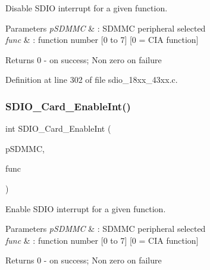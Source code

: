 Disable S\+D\+IO interrupt for a given function. 


\begin{DoxyParams}{Parameters}
{\em p\+S\+D\+M\+MC} & \+: S\+D\+M\+MC peripheral selected \\
\hline
{\em func} & \+: function number \mbox{[}0 to 7\mbox{]} \mbox{[}0 = C\+IA function\mbox{]} \\
\hline
\end{DoxyParams}
\begin{DoxyReturn}{Returns}
0 -\/ on success; Non zero on failure 
\end{DoxyReturn}


Definition at line 302 of file sdio\+\_\+18xx\+\_\+43xx.\+c.

\mbox{\label{group___s_d_i_o__18_x_x__43_x_x_ga304515a4a0d3e71651e74bbdde07ba3f}} 
\subsubsection{\texorpdfstring{S\+D\+I\+O\+\_\+\+Card\+\_\+\+Enable\+Int()}{SDIO\_Card\_EnableInt()}}
{\footnotesize\ttfamily int S\+D\+I\+O\+\_\+\+Card\+\_\+\+Enable\+Int (\begin{DoxyParamCaption}\item[{\hyperlink{struct_l_p_c___s_d_m_m_c___t}{L\+P\+C\+\_\+\+S\+D\+M\+M\+C\+\_\+T} $\ast$}]{p\+S\+D\+M\+MC,  }\item[{uint32\+\_\+t}]{func }\end{DoxyParamCaption})}



Enable S\+D\+IO interrupt for a given function. 


\begin{DoxyParams}{Parameters}
{\em p\+S\+D\+M\+MC} & \+: S\+D\+M\+MC peripheral selected \\
\hline
{\em func} & \+: function number \mbox{[}0 to 7\mbox{]} \mbox{[}0 = C\+IA function\mbox{]} \\
\hline
\end{DoxyParams}
\begin{DoxyReturn}{Returns}
0 -\/ on success; Non zero on failure 
\end{DoxyReturn}


